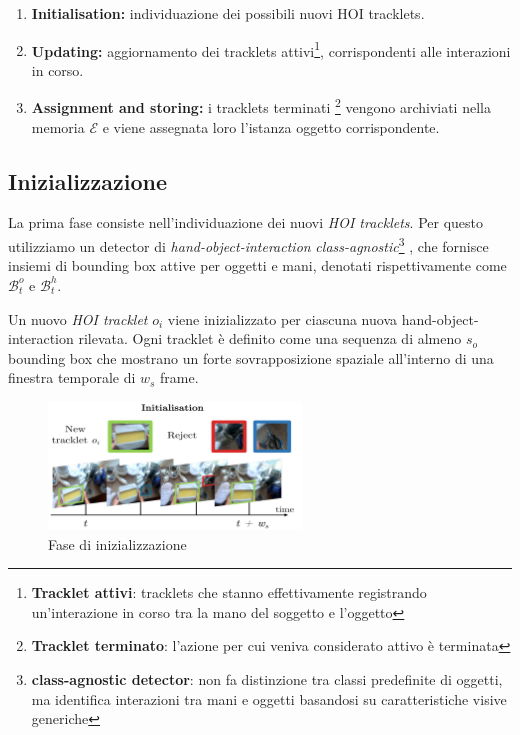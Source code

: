 \begin{enumerate}
    \item \textbf{Initialisation:} individuazione dei possibili nuovi HOI tracklets.
    \item \textbf{Updating:} aggiornamento dei tracklets attivi\footnote{\textbf{Tracklet attivi}: tracklets che stanno effettivamente registrando un'interazione in corso tra la mano del soggetto e l'oggetto}, corrispondenti alle interazioni in corso.
    \item \textbf{Assignment and storing:} i tracklets terminati \footnote{\textbf{Tracklet terminato}: l'azione per cui veniva considerato attivo è terminata} vengono archiviati nella memoria $\mathcal{E}$ e viene assegnata loro l'istanza oggetto corrispondente.
\end{enumerate}


\subsection*{Inizializzazione}
La prima fase consiste nell'individuazione dei nuovi \emph{HOI tracklets}. Per questo utilizziamo un detector di \emph{hand-object-interaction} \emph{class-agnostic}\footnote{\textbf{class-agnostic detector}: non fa distinzione tra classi predefinite di oggetti, ma identifica interazioni tra mani e oggetti basandosi su caratteristiche visive generiche} \cite{shan2020understandinghumanhandscontact}, che fornisce insiemi di bounding box attive per oggetti e mani, denotati rispettivamente come $\mathcal{B}_t^o$ e $\mathcal{B}_t^h$.

Un nuovo \emph{HOI tracklet} $o_i$ viene inizializzato per ciascuna nuova hand-object-interaction rilevata. Ogni tracklet è definito come una sequenza di almeno $s_o$ bounding box che mostrano un forte sovrapposizione spaziale all'interno di una finestra temporale di $w_s$ frame.

\begin{figure}[ht]
    \centering
    \includegraphics[width=0.6\textwidth]{Images/init.png}
    \caption{Fase di inizializzazione}
    \label{fig:init}
\end{figure}

